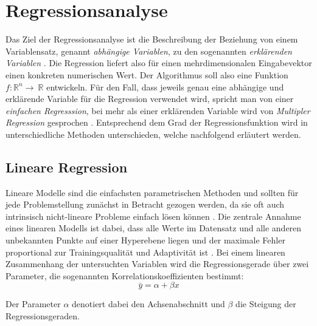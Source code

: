 \documentclass[
ngerman          %
,a4paper          %
,11pt
,pdftex
]{report}
\begin{document}
\section{Regressionsanalyse}
Das Ziel der Regressionsanalyse ist die Beschreibung der Beziehung von einem Variablensatz, genannt \textit{abhängige Variablen}, zu den sogenannten \textit{erklärenden Variablen} \cite[129]{thinkstats}. Die Regression liefert also für einen mehrdimensionalen Eingabevektor einen konkreten numerischen Wert. Der Algorithmus soll also eine Funktion $f: \mathbb{R}^n \rightarrow\ \mathbb{R}$ entwickeln. Für den Fall, dass jeweils genau eine abhängige und erklärende Variable für die Regression verwendet wird, spricht man von einer \textit{einfachen Regresssion}, bei mehr als einer erklärenden Variable wird von \textit{Multipler Regression} gesprochen \cite[129]{thinkstats}. Entsprechend dem Grad der Regressionsfunktion wird in unterschiedliche Methoden unterschieden, welche nachfolgend erläutert werden.

\subsection{Lineare Regression}
Lineare Modelle sind die einfachsten parametrischen Methoden und sollten für jede Problemstellung zunächst in Betracht gezogen werden, da sie oft auch intrinsisch nicht-lineare Probleme einfach lösen können \cite[72]{mlalgos}. Die zentrale Annahme eines linearen Modells ist dabei, dass alle Werte im Datensatz und alle anderen unbekannten Punkte auf einer Hyperebene liegen und der maximale Fehler proportional zur Trainingsqualität und Adaptivität ist \cite[73]{mlalgos}. Bei einem linearen Zusammenhang der untersuchten Variablen wird die Regressionsgerade über zwei Parameter, die sogenannten Korrelationskoeffizienten bestimmt:
\begin{equation}
	\bar{y} = \alpha + \beta x
\end{equation}

Der Parameter $\alpha$ denotiert dabei den Achsenabschnitt und $\beta$ die Steigung der Regressionsgeraden. \\
\par
\end{document}
